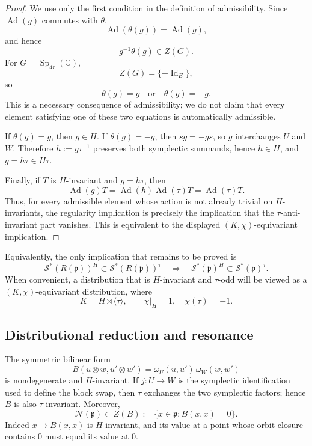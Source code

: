 \documentclass[10pt,a4paper]{amsart}
\numberwithin{equation}{section}
\newcommand{\C}{\mathbb C}
\newcommand{\Sp}{\operatorname{Sp}}
\newcommand{\Ad}{\operatorname{Ad}}
\newcommand{\Id}{\operatorname{Id}}
\newcommand{\cN}{\mathcal N}
\newcommand{\cS}{\mathcal S}
\begin{document}
\begin{proof}
We use only the first condition in the definition of admissibility.
Since \(\Ad(g)\) commutes with \(\theta\),
\[
\Ad(\theta(g))=\Ad(g),
\]
and hence
\[
g^{-1}\theta(g)\in Z(G).
\]
For \(G=\Sp_{4r}(\C)\),
\[
Z(G)=\{\pm\Id_E\},
\]
so
\[
\theta(g)=g
\quad\text{or}\quad
\theta(g)=-g.
\]
This is a necessary consequence of admissibility; we do not claim that
every element satisfying one of these two equations is automatically
admissible.

If \(\theta(g)=g\), then \(g\in H\).  If \(\theta(g)=-g\), then
\(sg=-gs\), so \(g\) interchanges \(U\) and \(W\).  Therefore
\(h:=g\tau^{-1}\) preserves both symplectic summands, hence \(h\in H\), and
\(g=h\tau\in H\tau\).

Finally, if \(T\) is \(H\)-invariant and \(g=h\tau\), then
\[
\Ad(g)T=\Ad(h)\Ad(\tau)T=\Ad(\tau)T.
\]
Thus, for every admissible element whose action is not already trivial on
\(H\)-invariants, the regularity implication is precisely the implication
that the \(\tau\)-anti-invariant part vanishes.  This is equivalent to the
displayed \((K,\chi)\)-equivariant implication.
\end{proof}

Equivalently, the only implication that remains to be proved is
\begin{equation}\label{cii:eq:regularity-implication}
\cS^*(R(\mathfrak p))^H
\subset
\cS^*(R(\mathfrak p))^\tau
\quad\Longrightarrow\quad
\cS^*(\mathfrak p)^H
\subset
\cS^*(\mathfrak p)^\tau.
\end{equation}
When convenient, a distribution that is \(H\)-invariant and
\(\tau\)-odd will be viewed as a \((K,\chi)\)-equivariant distribution,
where
\[
K=H\rtimes\langle\tau\rangle,
\qquad
\chi|_H=1,\quad \chi(\tau)=-1.
\]

\subsection{Distributional reduction and resonance}
\label{cii:sec:distributional}

The symmetric bilinear form
\begin{equation}\label{cii:eq:B}
B(u\otimes w,u'\otimes w')
=
\omega_U(u,u')\,\omega_W(w,w')
\end{equation}
is nondegenerate and \(H\)-invariant.  If \(j:U\to W\) is the symplectic
identification used to define the block swap, then \(\tau\) exchanges the
two symplectic factors; hence \(B\) is also \(\tau\)-invariant.  Moreover,
\begin{equation}\label{cii:eq:nilcone-isotropic}
\cN(\mathfrak p)\subset
Z(B):=\{x\in\mathfrak p:B(x,x)=0\}.
\end{equation}
Indeed \(x\mapsto B(x,x)\) is \(H\)-invariant, and its value at a point
whose orbit closure contains \(0\) must equal its value at \(0\).
\end{document}
